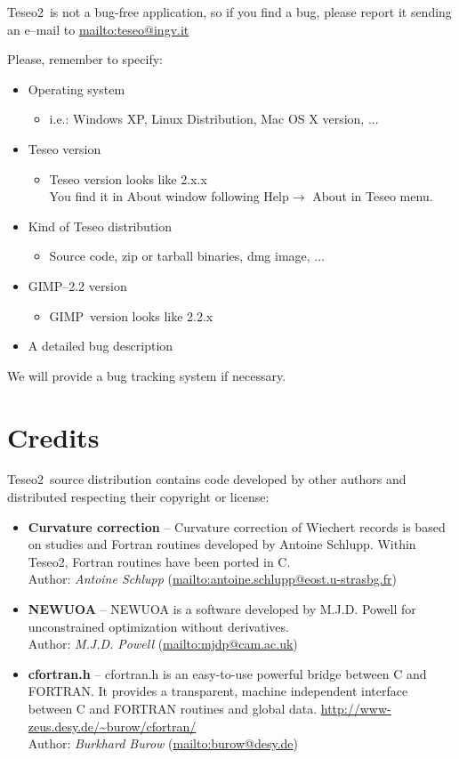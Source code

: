 \documentclass[a4paper,11pt]{article}
\newcommand{\teseo}[0]{{Teseo\small 2}}
\newcommand{\gimp}[0]{{GIMP}\index{GIMP}}
\begin{document}
\teseo\ is not a bug-free application, so if you find a bug, please report it sending an e--mail to \url{mailto:teseo@ingv.it} 

Please, remember to specify:
\begin{itemize}
\item Operating system
	\begin{itemize}
	\item {\small i.e.: Windows XP, Linux Distribution, Mac OS X version, ...}
	\end{itemize}
\item Teseo version
	\begin{itemize}
	\item {\small Teseo version looks like 2.x.x\\
	You find it in About window following Help$\rightarrow$ About in Teseo menu.}
	\end{itemize}
\item Kind of Teseo distribution
	\begin{itemize}
	\item {\small Source code, zip or tarball binaries, dmg image, ...}
	\end{itemize}
\item \gimp--2.2 version
	\begin{itemize}
	\item {\small \gimp\ version looks like 2.2.x}
	\end{itemize}
\item A detailed bug description
\end{itemize}

We will provide a bug tracking system if necessary.


\section{Credits}
\label{sec:credits}

\teseo\ source distribution contains code developed by other authors
and distributed respecting their copyright or license:

\begin{itemize}
\item {\bfseries Curvature correction} -- Curvature correction of Wiechert records is based on studies and Fortran routines developed by Antoine Schlupp. Within \teseo, Fortran routines have been ported in C.\\
	Author: {\itshape Antoine Schlupp} (\url{mailto:antoine.schlupp@eost.u-strasbg.fr})
\item {\bfseries NEWUOA} -- NEWUOA is a software developed by M.J.D. Powell for unconstrained optimization without derivatives.\\
	Author:  {\itshape M.J.D. Powell} (\url{mailto:mjdp@cam.ac.uk})
\item {\bfseries cfortran.h} -- cfortran.h is an easy-to-use powerful bridge between C and FORTRAN. It provides a transparent, machine independent interface between C and FORTRAN routines and global data. \url{http://www-zeus.desy.de/~burow/cfortran/}\\
	Author: {\itshape Burkhard Burow} (\url{mailto:burow@desy.de})
\end{itemize}
\end{document}
